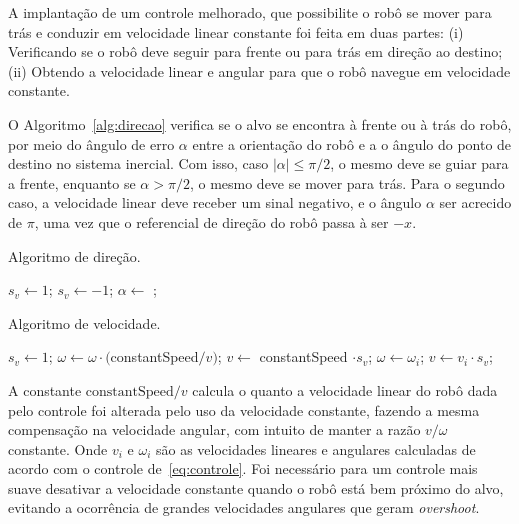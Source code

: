 A implantação de um controle melhorado, que possibilite o robô se mover para trás e conduzir em velocidade linear constante foi feita em duas partes: (i) Verificando se o robô deve seguir para frente ou para trás em direção ao destino; (ii) Obtendo a velocidade linear e angular para que o robô navegue em velocidade constante.

O Algoritmo~\ref{alg:direcao} verifica se o alvo se encontra à frente ou à trás do robô, por meio do ângulo de erro $\alpha$ entre a orientação do robô e a o ângulo do ponto de destino no sistema inercial. Com isso, caso $|\alpha| \le \pi/2 $, o mesmo deve se guiar para a frente, enquanto se $\alpha > \pi/2$, o mesmo deve se mover para trás. Para o segundo caso, a velocidade linear deve receber um sinal negativo, e o ângulo $\alpha$ ser acrecido de $\pi$, uma vez que o referencial de direção do robô passa à ser $-x$.

\begin{algorithm}
	\caption{Algoritmo de direção.}\label{alg:direcao}
	\begin{algorithmic}[1]
		\State $s_v \gets 1$;
				\State $s_v \gets -1$;
				\State $\alpha \gets $ ;
			\EndIf
		\EndIf
		\end{algorithmic}
\end{algorithm}

\begin{algorithm}
\caption{Algoritmo de velocidade.}\label{alg:velocidade}
\begin{algorithmic}[1]
	\State $s_v \gets 1$;
	\State $\omega \gets \omega\cdot ($constantSpeed$/v)$;
	\State $v \gets $ constantSpeed $\cdot s_v$;
	\Else
	\State $\omega \gets \omega_i$;
	\State $v \gets v_i \cdot s_v$;
	\EndIf
	\EndIf
\end{algorithmic}
\end{algorithm}

A constante $\text{constantSpeed}/v$ calcula o quanto a velocidade linear do robô dada pelo controle foi alterada pelo uso da velocidade constante, fazendo a mesma compensação na velocidade angular, com intuito de manter a razão $v/\omega$ constante. Onde $v_i$ e $\omega_i$ são as velocidades lineares e angulares calculadas de acordo com o controle de~\eqref{eq:controle}. Foi necessário para um controle mais suave desativar a velocidade constante quando o robô está bem próximo do alvo, evitando a ocorrência de grandes velocidades angulares que geram \textit{overshoot}.


